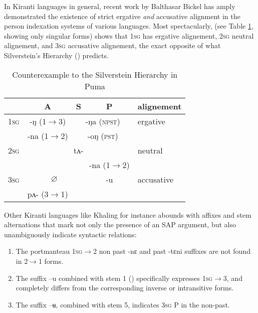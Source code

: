 \documentclass[oldfontcommands,oneside,a4paper,11pt]{article}
\newcommand{\ipa}[1]{{\phon \mbox{#1}}} %
\newcommand{\grise}[1]{\cellcolor{lightgray}\textbf{#1}}
\begin{document}
In Kiranti languages in general, recent work by Balthasar Bickel has amply demonstrated the existence of strict ergative \textit{and} accusative alignment in the person indexation systems of various languages. Most spectacularly, \citealt{bickel08scope} (see Table \ref{tab:silverstein}, showing only singular forms) shows that \textsc{1sg} has ergative alignement, \textsc{2sg} neutral alignement, and \textsc{3sg} accusative alignement, the exact opposite of what  Silverstein's Hierarchy (\citealt{silverstein76}) predicts.


\begin{table}[H]
\caption{Counterexample to the Silverstein Hierarchy in Puma} \label{tab:silverstein} \centering
\begin{tabular}{l|c|c|c|l}
\toprule
& A & S & P & alignement\\
\hline
\textsc{1sg}& \ipa{-ŋ} (1$\rightarrow$3)& \multicolumn{2}{|c|}{\ipa{-ŋa} \grise{}(\textsc{npst})}  &ergative\\
 & \ipa{-na} (1$\rightarrow$2)& \multicolumn{2}{|c|}{\ipa{-oŋ} \grise{}(\textsc{pst})} &\\
\hline
 \textsc{2sg} & \multicolumn{3}{c|}{\ipa{tʌ-}}& neutral\\
 \cline{4-4}
 &\multicolumn{2}{c|}{}&\ipa{-na} (1$\rightarrow$2)&\\
 \hline
  \textsc{3sg} & \multicolumn{2}{c|}{$\varnothing$} & \ipa{-u} &accusative\\
   \cline{2-2}
  &\ipa{pʌ-}  (3$\rightarrow$1) & &\\
  \bottomrule
\end{tabular}
\end{table}
Other Kiranti languages like Khaling for instance abounds with affixes and stem alternations that mark not only the presence of an SAP argument, but also unambiguously indicate syntactic relations:

\begin{enumerate}
\item The portmanteau \textsc{1sg$\rightarrow$2} non past \ipa{-nɛ} and past \ipa{-tɛni} suffixes are not found in 2$\rightarrow$1 forms.
\item The suffix \ipa{--u}  combined with stem 1 (\citealt[1104]{jacques12khaling}) specifically expresses \textsc{1sg$\rightarrow$3}, and completely differs from the corresponding inverse or intransitive forms.
\item The suffix \ipa{--ʉ}, combined with stem 5, indicates \textsc{3sg} P in the non-past.
\end{enumerate}
\end{document}
